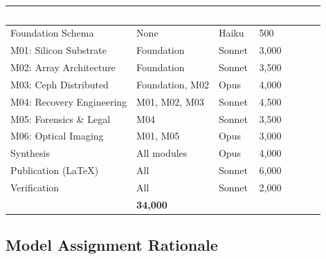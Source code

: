 \documentclass[11pt,letterpaper]{article}
\newcommand{\tableheader}[1]{\textbf{\sffamily\textcolor{white}{#1}}}
\begin{document}
\begin{center}
\begin{tabularx}{\textwidth}{L{3cm}L{2.5cm}C{1.5cm}C{2cm}}
\toprule
{}
\tableheader{Component} & \tableheader{Dependencies} & \tableheader{Model} & \tableheader{Est. Tokens} \\
\midrule
Foundation Schema & None & Haiku & 500 \\
M01: Silicon Substrate & Foundation & Sonnet & 3,000 \\
M02: Array Architecture & Foundation & Sonnet & 3,500 \\
M03: Ceph Distributed & Foundation, M02 & Opus & 4,000 \\
M04: Recovery Engineering & M01, M02, M03 & Sonnet & 4,500 \\
M05: Forensics \& Legal & M04 & Sonnet & 3,500 \\
M06: Optical Imaging & M01, M05 & Opus & 3,000 \\
Synthesis & All modules & Opus & 4,000 \\
Publication (LaTeX) & All & Sonnet & 6,000 \\
Verification & All & Sonnet & 2,000 \\
\midrule
{}
 & \textbf{34,000} \\
\bottomrule
\end{tabularx}
\end{center}

\subsection{Model Assignment Rationale}
\end{document}
